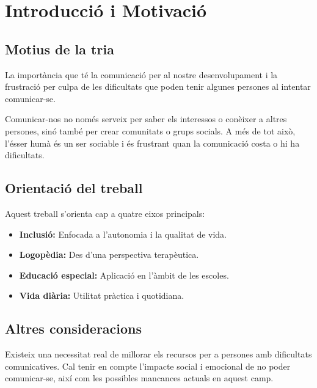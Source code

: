 \chapter{Introducció i Motivació}
\thispagestyle{fancy}

\section{Motius de la tria}
La importància que té la comunicació per al nostre desenvolupament i la frustració per culpa de les dificultats que poden tenir algunes persones al intentar comunicar-se.

Comunicar-nos no només serveix per saber els interessos o conèixer a altres persones, sinó també per crear comunitats o grups socials. A més de tot això, l'ésser humà és un ser sociable i és frustrant quan la comunicació costa o hi ha dificultats.

\section{Orientació del treball}
Aquest treball s'orienta cap a quatre eixos principals:
\begin{itemize}
    \item \textbf{Inclusió:} Enfocada a l'autonomia i la qualitat de vida.
    \item \textbf{Logopèdia:} Des d'una perspectiva terapèutica.
    \item \textbf{Educació especial:} Aplicació en l'àmbit de les escoles.
    \item \textbf{Vida diària:} Utilitat pràctica i quotidiana.
\end{itemize}

\section{Altres consideracions}
Existeix una necessitat real de millorar els recursos per a persones amb dificultats comunicatives. Cal tenir en compte l'impacte social i emocional de no poder comunicar-se, així com les possibles mancances actuals en aquest camp.

